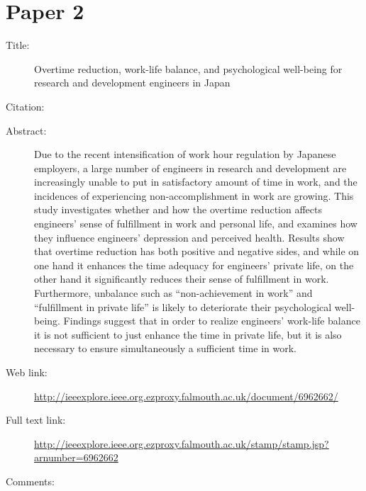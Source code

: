 \documentclass{scrartcl}
\begin{document}
\section*{Paper 2}
\begin{description}
\item[Title: ]Overtime reduction, work-life balance, and psychological well-being for research and development engineers in Japan
\item[Citation:] \cite{fujimoto2013overtime}
\item[Abstract:] Due to the recent intensification of work hour regulation by Japanese employers, a large number of engineers in research and development are increasingly unable to put in satisfactory amount of time in work, and the incidences of experiencing non-accomplishment in work are growing. This study investigates whether and how the overtime reduction affects engineers' sense of fulfillment in work and personal life, and examines how they influence engineers' depression and perceived health. Results show that overtime reduction has both positive and negative sides, and while on one hand it enhances the time adequacy for engineers' private life, on the other hand it significantly reduces their sense of fulfillment in work. Furthermore, unbalance such as “non-achievement in work” and “fulfillment in private life” is likely to deteriorate their psychological well-being. Findings suggest that in order to realize engineers' work-life balance it is not sufficient to just enhance the time in private life, but it is also necessary to ensure simultaneously a sufficient time in work.
\item[Web link:]\url{http://ieeexplore.ieee.org.ezproxy.falmouth.ac.uk/document/6962662/}
\item[Full text link:]\url {http://ieeexplore.ieee.org.ezproxy.falmouth.ac.uk/stamp/stamp.jsp?arnumber=6962662}
\item[Comments:]
\end{description}
\end{document}
